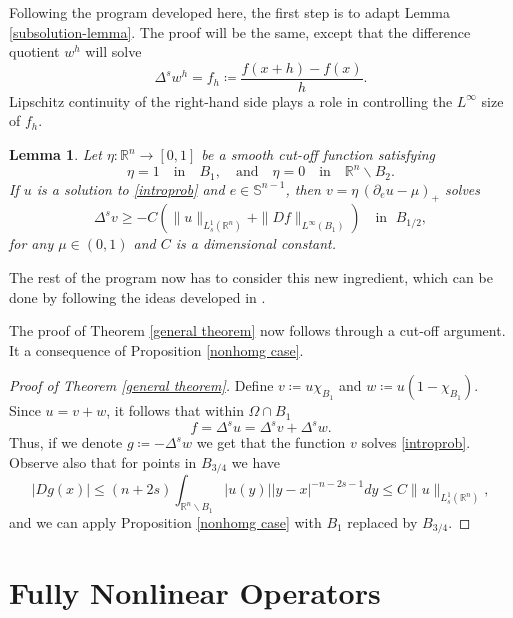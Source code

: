\documentclass[reqno,11pt]{amsart}
\newtheorem{lemma}{Lemma}[section]
\numberwithin{equation}{section}
\numberwithin{equation}{section}
\begin{document}
Following the program developed here, the first step is to adapt Lemma \ref{subsolution-lemma}. The proof will be the same, except that the difference quotient $w^h$ will solve
$$
    \Delta^s w^h = f_h \coloneqq\frac{f(x+h)-f(x)}{h}.
$$
Lipschitz continuity of the right-hand side plays a role in controlling the $L^\infty$ size of $f_h$.

\begin{lemma}
Let $\eta \colon \mathbb{R}^n \to [0,1]$ be a smooth cut-off function satisfying
$$
    \eta = 1 \quad \mbox{in} \quad  B_1, \quad \mbox{and} \quad \eta = 0 \quad \mbox{in} \quad \mathbb{R}^n \backslash B_2.
$$
If $u$ is a solution to \eqref{introprob} and $e \in \mathbb{S}^{n-1}$, then $v = \eta\,(\partial_e u - \mu)_+$ solves
$$
    \Delta^s v \geq -C\left(\|u\|_{L^1_s(\mathbb{R}^n)} +\|Df\|_{L^\infty(B_1)} \right)\quad \mbox{in }\; B_{1/2},
$$
for any $\mu \in (0,1)$ and $C$ is a dimensional constant.
\end{lemma}

The rest of the program now has to consider this new ingredient, which can be done by following the ideas developed in \cite{AST}.

\medskip

The proof of Theorem \ref{general theorem} now follows through a cut-off argument. It a consequence of Proposition \ref{nonhomg case}.

\begin{proof}[Proof of Theorem \ref{general theorem}]
Define $v \coloneqq u \chi_{B_1}$ and $w \coloneqq u (1 - \chi_{B_1})$. Since $u = v + w$, it follows that within $\Omega \cap B_1$
$$
    f = \Delta^s u = \Delta^s v + \Delta^s w.
$$
Thus, if we denote $g \coloneqq - \Delta^s w$ we get that the function $v$ solves \eqref{introprob}. Observe also that for points in $B_{3/4}$ we have
$$
    |Dg(x)| \leq (n+2s)\int_{\mathbb{R}^n\backslash B_1} |u(y)||y-x|^{-n-2s-1}dy \leq C\|u\|_{L^1_s(\mathbb{R}^n)},
$$
and we can apply Proposition \ref{nonhomg case} with $B_1$ replaced by $B_{3/4}$.
\end{proof}

\section{Fully Nonlinear Operators}\label{extensions-sct}
\end{document}
